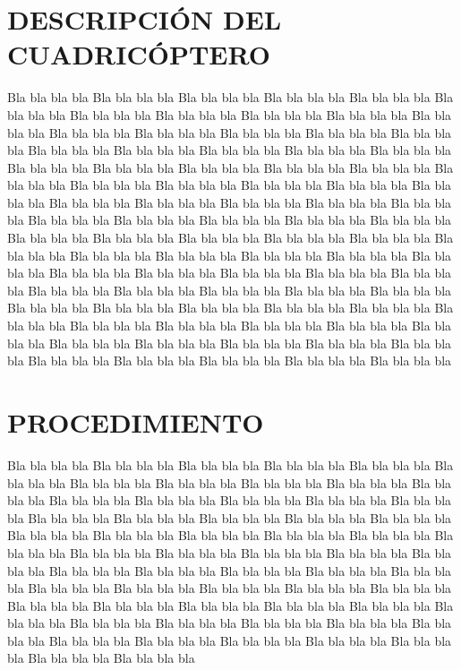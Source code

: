 \documentclass[letterpaper, 10 pt, conference]{ieeeconf}  %
\begin{document}
\section{DESCRIPCIÓN DEL CUADRICÓPTERO}
Bla bla bla bla Bla bla bla bla Bla bla bla bla Bla bla bla bla
Bla bla bla bla Bla bla bla bla Bla bla bla bla Bla bla bla bla
Bla bla bla bla Bla bla bla bla Bla bla bla bla Bla bla bla bla
Bla bla bla bla Bla bla bla bla Bla bla bla bla Bla bla bla bla
Bla bla bla bla Bla bla bla bla Bla bla bla bla Bla bla bla bla
Bla bla bla bla Bla bla bla bla Bla bla bla bla Bla bla bla bla
Bla bla bla bla Bla bla bla bla Bla bla bla bla Bla bla bla bla
Bla bla bla bla Bla bla bla bla Bla bla bla bla Bla bla bla bla
Bla bla bla bla Bla bla bla bla Bla bla bla bla Bla bla bla bla
Bla bla bla bla Bla bla bla bla Bla bla bla bla Bla bla bla bla
Bla bla bla bla Bla bla bla bla Bla bla bla bla Bla bla bla bla
Bla bla bla bla Bla bla bla bla Bla bla bla bla Bla bla bla bla
Bla bla bla bla Bla bla bla bla Bla bla bla bla Bla bla bla bla
Bla bla bla bla Bla bla bla bla Bla bla bla bla Bla bla bla bla
Bla bla bla bla Bla bla bla bla Bla bla bla bla Bla bla bla bla
Bla bla bla bla Bla bla bla bla Bla bla bla bla Bla bla bla bla
Bla bla bla bla Bla bla bla bla Bla bla bla bla Bla bla bla bla
Bla bla bla bla Bla bla bla bla Bla bla bla bla Bla bla bla bla
Bla bla bla bla Bla bla bla bla Bla bla bla bla Bla bla bla bla
Bla bla bla bla Bla bla bla bla Bla bla bla bla Bla bla bla bla
Bla bla bla bla Bla bla bla bla Bla bla bla bla Bla bla bla bla
\section{PROCEDIMIENTO}
Bla bla bla bla Bla bla bla bla Bla bla bla bla Bla bla bla bla
Bla bla bla bla Bla bla bla bla Bla bla bla bla Bla bla bla bla
Bla bla bla bla Bla bla bla bla Bla bla bla bla Bla bla bla bla
Bla bla bla bla Bla bla bla bla Bla bla bla bla Bla bla bla bla
Bla bla bla bla Bla bla bla bla Bla bla bla bla Bla bla bla bla
Bla bla bla bla Bla bla bla bla Bla bla bla bla Bla bla bla bla
Bla bla bla bla Bla bla bla bla Bla bla bla bla Bla bla bla bla
Bla bla bla bla Bla bla bla bla Bla bla bla bla Bla bla bla bla
Bla bla bla bla Bla bla bla bla Bla bla bla bla Bla bla bla bla
Bla bla bla bla Bla bla bla bla Bla bla bla bla Bla bla bla bla
Bla bla bla bla Bla bla bla bla Bla bla bla bla Bla bla bla bla
Bla bla bla bla Bla bla bla bla Bla bla bla bla Bla bla bla bla
Bla bla bla bla Bla bla bla bla Bla bla bla bla Bla bla bla bla
Bla bla bla bla Bla bla bla bla Bla bla bla bla Bla bla bla bla
Bla bla bla bla Bla bla bla bla Bla bla bla bla Bla bla bla bla
\end{document}

